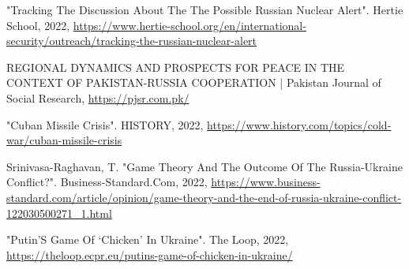 \documentclass[runningheads]{llncs}
\begin{document}
\begin{thebibliography}{8}
"Tracking The Discussion About The The Possible Russian Nuclear Alert". Hertie School, 2022, \href{https://www.hertie-school.org/en/international-security/outreach/tracking-the-russian-nuclear-alert}{https://www.hertie-school.org/en/international-security/outreach/tracking-the-russian-nuclear-alert}

REGIONAL DYNAMICS AND PROSPECTS FOR PEACE IN THE CONTEXT OF PAKISTAN-RUSSIA COOPERATION | Pakistan Journal of Social Research, \href{https://pjsr.com.pk/}{https://pjsr.com.pk/}

"Cuban Missile Crisis". HISTORY, 2022, \href{https://www.history.com/topics/cold-war/cuban-missile-crisis}{https://www.history.com/topics/cold-war/cuban-missile-crisis}

Srinivasa-Raghavan, T. "Game Theory And The Outcome Of The Russia-Ukraine Conflict?". Business-Standard.Com, 2022, \href{https://www.business-standard.com/article/opinion/game-theory-and-the-end-of-russia-ukraine-conflict-122030500271_1.html}{https://www.business-standard.com/article/opinion/game-theory-and-the-end-of-russia-ukraine-conflict-122030500271_1.html}

"Putin’S Game Of ‘Chicken’ In Ukraine". The Loop, 2022, \href{https://theloop.ecpr.eu/putins-game-of-chicken-in-ukraine/}{https://theloop.ecpr.eu/putins-game-of-chicken-in-ukraine/}

\end{thebibliography}
\end{document}
